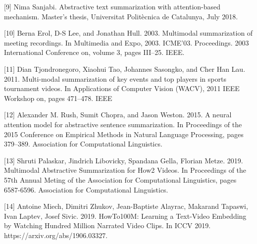 \documentclass{article}
\begin{document}
[9] Nima Sanjabi. Abstractive text summarization with attention-based mechanism. Master’s thesis, Universitat Politècnica de Catalunya, July 2018.

[10] Berna Erol, D-S Lee, and Jonathan Hull. 2003. Multimodal summarization of meeting recordings. In Multimedia and Expo, 2003. ICME’03. Proceedings. 2003 International Conference on, volume 3, pages III–25. IEEE.

[11] Dian Tjondronegoro, Xiaohui Tao, Johannes Sasongko, and Cher Han Lau. 2011. Multi-modal summarization of key events and top players in sports tournament videos. In Applications of Computer Vision (WACV), 2011 IEEE Workshop on, pages 471–478. IEEE

[12] Alexander M. Rush, Sumit Chopra, and Jason Weston. 2015. A neural attention model for abstractive sentence summarization. In Proceedings of the 2015 Conference on Empirical Methods in Natural Language Processing, pages 379–389. Association for Computational Linguistics.

[13] Shruti Palaskar, Jindrich Libovicky, Spandana Gella, Florian Metze. 2019. Multimodal Abstractive Summarization for How2 Videos. In Proceedings of the 57th Annual Meting of the Association for Computational Linguistics, pages 6587-6596. Association for Computational Linguistics.

[14] Antoine Miech, Dimitri Zhukov, Jean-Baptiste Alayrac, Makarand Tapaswi, Ivan Laptev, Josef Sivic. 2019. HowTo100M: Learning a Text-Video Embedding by Watching Hundred Million Narrated Video Clips. In ICCV 2019. https://arxiv.org/abs/1906.03327.
\end{document}
